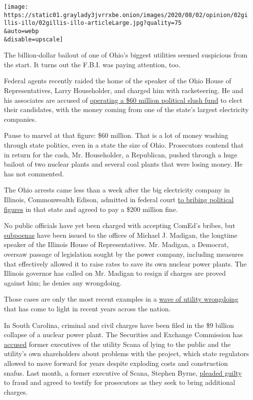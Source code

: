 \texttt{[image: https://static01.graylady3jvrrxbe.onion/images/2020/08/02/opinion/02gillis-illo/02gillis-illo-articleLarge.jpg?quality=75\\\&auto=webp\\\&disable=upscale]}

The billion-dollar bailout of one of Ohio's biggest utilities seemed
suspicious from the start. It turns out the F.B.I. was paying attention,
too.

Federal agents recently raided the home of the speaker of the Ohio House
of Representatives, Larry Householder, and charged him with
racketeering. He and his associates are accused of
\href{about:blank}{operating a \$60 million political slush fund} to
elect their candidates, with the money coming from one of the state's
largest electricity companies.

Pause to marvel at that figure: \$60 million. That is a lot of money
washing through state politics, even in a state the size of Ohio.
Prosecutors contend that in return for the cash, Mr. Householder, a
Republican, pushed through a huge bailout of two nuclear plants and
several coal plants that were losing money. He has not commented.

The Ohio arrests came less than a week after the big electricity company
in Illinois, Commonwealth Edison, admitted in federal court
\href{about:blank}{to bribing political figures} in that state and
agreed to pay a \$200 million fine.

No public officials have yet been charged with accepting ComEd's bribes,
but
\href{https://www.npr.org/local/309/2020/07/20/893009659/breaking-down-the-com-ed-patronage-scandal-and-what-s-next-for-michael-madigan}{subpoenas}
have been issued to the offices of Michael J. Madigan, the longtime
speaker of the Illinois House of Representatives. Mr. Madigan, a
Democrat, oversaw passage of legislation sought by the power company,
including measures that effectively allowed it to raise rates to save
its own nuclear power plants. The Illinois governor has called on Mr.
Madigan to resign if charges are proved against him; he denies any
wrongdoing.

Those cases are only the most recent examples in a
\href{https://www.energyandpolicy.org/utility-corruption/}{wave of
utility wrongdoing} that has come to light in recent years across the
nation.

In South Carolina, criminal and civil charges have been filed in the \$9
billion collapse of a nuclear power plant. The Securities and Exchange
Commission has
\href{https://www.wsj.com/articles/sec-charges-south-carolina-companies-executives-in-failed-nuclear-project-case-11582855101}{accused}
former executives of the utility Scana of lying to the public and the
utility's own shareholders about problems with the project, which state
regulators allowed to move forward for years despite exploding costs and
construction snafus. Last month, a former executive of Scana, Stephen
Byrne,
\href{https://www.postandcourier.com/business/former-scana-executive-pleads-guilty-to-charges-tied-to-failed-sc-nuclear-project/article_26e23ca8-c50b-11ea-8377-e7b39854212b.html}{pleaded
guilty} to fraud and agreed to testify for prosecutors as they seek to
bring additional charges.

